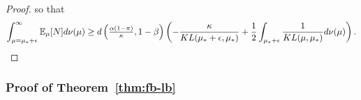 \begin{proof}
so that
 \begin{align*}
 \int_{\mu=\mu_*+\epsilon}^\infty \mathbb{E}_\mu[N] d\nu(\mu) \geq d\left( \tfrac{\alpha(1-\pi)}{\kappa}, 1-\beta \right) \left(  - \frac{\kappa}{KL(\mu_* + \epsilon, \mu_*)}  + \frac{1}{2} \int_{\mu_*+\epsilon} \frac{1}{KL(\mu,\mu_*)} d\nu(\mu) \right).
 \end{align*}
 \end{proof}

\subsubsection{Proof of Theorem~\ref{thm:fb-lb}}

